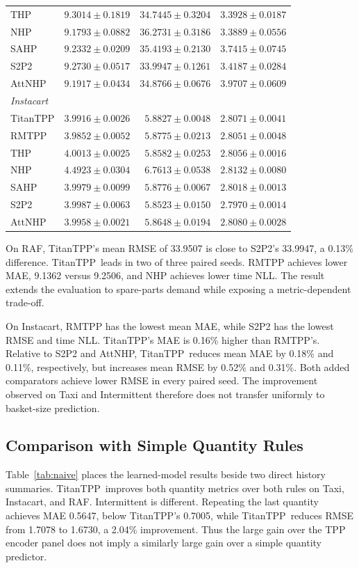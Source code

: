 \documentclass[runningheads]{llncs}
\newcommand{\method}{TitanTPP}
\begin{document}
\begin{table}[p]
\begin{tabular}{lrrr}
THP & $9.3014\pm0.1819$ & $34.7445\pm0.3204$ & $3.3928\pm0.0187$\\
NHP & $9.1793\pm0.0882$ & $36.2731\pm0.3186$ & $\mathbf{3.3889\pm0.0556}$\\
SAHP & $9.2332\pm0.0209$ & $35.4193\pm0.2130$ & $3.7415\pm0.0745$\\
S2P2 & $9.2730\pm0.0517$ & $33.9947\pm0.1261$ & $3.4187\pm0.0284$\\
AttNHP & $9.1917\pm0.0434$ & $34.8766\pm0.0676$ & $3.9707\pm0.0609$\\
\midrule
\multicolumn{4}{l}{\textit{Instacart}}\\
TitanTPP & $3.9916\pm0.0026$ & $5.8827\pm0.0048$ & $2.8071\pm0.0041$\\
RMTPP & $\mathbf{3.9852\pm0.0052}$ & $5.8775\pm0.0213$ & $2.8051\pm0.0048$\\
THP & $4.0013\pm0.0025$ & $5.8582\pm0.0253$ & $2.8056\pm0.0016$\\
NHP & $4.4923\pm0.0304$ & $6.7613\pm0.0538$ & $2.8132\pm0.0080$\\
SAHP & $3.9979\pm0.0099$ & $5.8776\pm0.0067$ & $2.8018\pm0.0013$\\
S2P2 & $3.9987\pm0.0063$ & $\mathbf{5.8523\pm0.0150}$ & $\mathbf{2.7970\pm0.0014}$\\
AttNHP & $3.9958\pm0.0021$ & $5.8648\pm0.0194$ & $2.8080\pm0.0028$\\
\bottomrule
\end{tabular}
\end{table}

On RAF, \method's mean RMSE of 33.9507 is close to S2P2's 33.9947, a 0.13\%
difference. \method\ leads in two of three paired seeds. RMTPP achieves lower
MAE, 9.1362 versus 9.2506, and NHP achieves lower time NLL. The result
extends the evaluation to spare-parts demand while exposing a metric-dependent
trade-off.

On Instacart, RMTPP has the lowest mean MAE, while S2P2 has the lowest RMSE
and time NLL. \method's MAE is 0.16\% higher than RMTPP's. Relative to S2P2
and AttNHP, \method\ reduces mean MAE by 0.18\% and 0.11\%, respectively,
but increases mean RMSE by 0.52\% and 0.31\%. Both added comparators achieve
lower RMSE in every paired seed. The improvement observed on Taxi and
Intermittent therefore does not transfer uniformly to basket-size prediction.

\subsection{Comparison with Simple Quantity Rules}
Table~\ref{tab:naive} places the learned-model results beside two direct
history summaries. \method\ improves both quantity metrics over both rules
on Taxi, Instacart, and RAF. Intermittent is different. Repeating the last
quantity achieves MAE 0.5647, below \method's 0.7005, while \method\ reduces
RMSE from 1.7078 to 1.6730, a 2.04\% improvement. Thus the large gain over
the TPP encoder panel does not imply a similarly large gain over a simple
quantity predictor.
\end{document}
